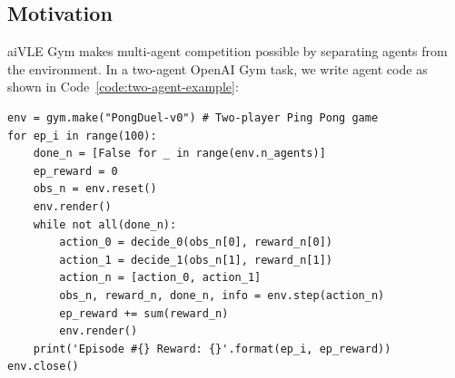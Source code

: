 \documentclass[fyp]{socreport}
\newenvironment{code}{\captionsetup{type=listing}}{}
\begin{document}
\subsection{Motivation}
aiVLE Gym makes multi-agent competition possible by separating agents from the environment. In a two-agent OpenAI Gym task, we write agent code as shown in Code~\ref{code:two-agent-example}:

\begin{code}
\begin{verbatim}
env = gym.make("PongDuel-v0") # Two-player Ping Pong game
for ep_i in range(100):
    done_n = [False for _ in range(env.n_agents)]
    ep_reward = 0
    obs_n = env.reset()
    env.render()
    while not all(done_n):
        action_0 = decide_0(obs_n[0], reward_n[0])
        action_1 = decide_1(obs_n[1], reward_n[1])
        action_n = [action_0, action_1]
        obs_n, reward_n, done_n, info = env.step(action_n)
        ep_reward += sum(reward_n)
        env.render()
    print('Episode #{} Reward: {}'.format(ep_i, ep_reward))
env.close()
\end{verbatim}
\label{code:two-agent-example}
\end{code}
\end{document}
